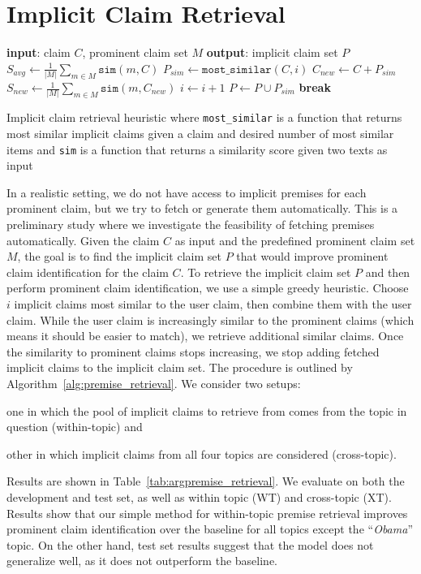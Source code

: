 \section{Implicit Claim Retrieval}
\label{sec:argpremise_retrieval}

\begin{algorithm}[t]
\begin{algorithmic}[1]
\State \textbf{input}: claim $C$, prominent claim set $M$
\State \textbf{output}: implicit claim set $P$
\State
\State $S_{avg} \gets \frac{1}{|M|} \sum_{m \in M} \mathtt{sim}(m, C)$
  \State $P_{sim} \gets \mathtt{most\_similar}(C, i)$
  \State $C_{new} \gets C + P_{sim}$
  \State $S_{new} \gets \frac{1}{|M|} \sum_{m \in M} \mathtt{sim}(m, C_{new})$
  \State
    \State $i \gets i + 1$
    \State $P \gets P \cup P_{sim}$
  \Else
    \State \textbf{break}
  \EndIf
  \State
\EndFor
\end{algorithmic}
\caption{Implicit claim retrieval heuristic where \texttt{most\_similar} is a
	function that returns most similar implicit claims given a claim and
	desired number of most similar items and \texttt{sim} is a function that
	returns a similarity score given two texts as input}
\label{alg:premise_retrieval}
\end{algorithm}

In a realistic setting, we do not have access to implicit premises 
for each prominent claim, but we try to fetch or generate them automatically. 
This is a preliminary study where we investigate the feasibility of fetching 
premises automatically. 
Given the claim $C$ as input and the predefined prominent claim set $M$, the
goal is to find the implicit claim set $P$ that would improve prominent claim
identification for the claim $C$. 
To retrieve the implicit claim set $P$ and then perform prominent claim
identification, we use a simple greedy heuristic. 
Choose $i$ implicit claims most similar to the user claim, then combine them
with the user claim.
While the user claim is increasingly similar to the prominent claims (which
means it should be easier to match), we retrieve additional similar claims. 
Once the similarity to prominent claims stops increasing, we stop
adding fetched implicit claims to the implicit claim set. The procedure 
is outlined by Algorithm~\ref{alg:premise_retrieval}.
We consider two setups: 
\begin{enumerate*}[label=(\arabic*)]
\item one in which the pool of implicit claims to retrieve
from comes from the topic in question (within-topic) and 
\item other in which implicit claims from all four topics are considered (cross-topic). 
\end{enumerate*}
Results are shown in Table~\ref{tab:argpremise_retrieval}. 
We evaluate on both the development and test set, as well as within topic (WT)
and cross-topic (XT). 
Results show that our simple method for within-topic premise retrieval improves
prominent claim identification over the baseline for all topics except the ``\emph{Obama}'' topic. 
On the other hand, test set results suggest that the model does not generalize well, 
as it does not outperform the baseline. 


